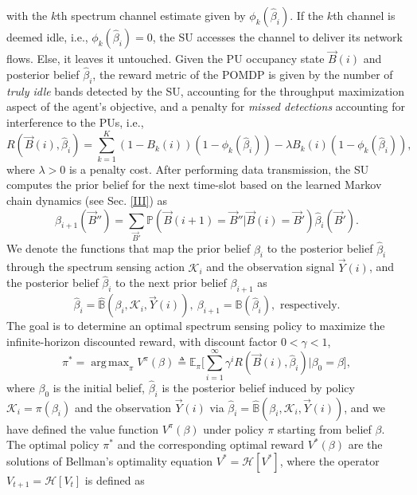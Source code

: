 \documentclass[10pt,twocolumn]{IEEEtran}
\DeclareMathOperator*{\argmax}{arg\,max}
\begin{document}
with the $k$th spectrum channel estimate given by $\phi_k(\hat{\beta}_{i})$. If  the $k$th channel is deemed idle, i.e., $\phi_{k}(\hat{\beta}_{i}){=}0$, the SU accesses the channel to deliver its network flows. Else, it leaves it untouched. Given the PU occupancy state $\vec{B}(i)$ and posterior belief $\hat\beta_i$, the reward metric of the POMDP is given by the number of \emph{truly idle} bands detected by the SU, accounting for the throughput maximization aspect of the agent's objective, and a penalty for \emph{missed detections} accounting for interference to the PUs, i.e.,
\begin{equation}
\nonumber
    R(\vec{B}(i), \hat{\beta}_i){=}\sum_{k=1}^{K} (1{-}B_k(i))(1{-}\phi_k(\hat{\beta}_{i})){-}\lambda B_k(i)(1 - \phi_k(\hat{\beta}_i)),
\end{equation}
where $\lambda{>}0$ is a penalty cost. After performing data transmission, the SU computes the prior belief for the next time-slot based on the learned Markov chain dynamics
(see Sec. \ref{III}) as
\begin{equation}\label{13}
    \beta_{i+1}(\vec{B}'')=\sum_{\vec{B}'}\mathbb{P}(\vec{B}(i+1) = \vec{B}''|\vec{B}(i)=\vec{B}')\hat{\beta}_{i}(\vec{B}').
\end{equation}
We denote the functions that map the prior belief $\beta_i$ to the posterior belief $\hat\beta_i$ through the spectrum sensing action $\mathcal K_i$ and the observation signal $\vec{Y}(i)$, and the posterior belief $\hat\beta_i$ to the next prior belief $\beta_{i+1}$ as
$$\hat\beta_i{=}\hat{\mathbb B}(\beta_i, \mathcal K_i, \vec{Y}(i)),\ \beta_{i+1}{=}{\mathbb B}(\hat\beta_i),\text{ respectively}.$$
The goal is to determine an optimal spectrum sensing policy to maximize the infinite-horizon discounted reward, with discount factor $0{<}\gamma{<}1$,
\begin{equation}\label{14}
    \pi^{*}{=}\argmax_{\pi} V^{\pi}(\beta) \triangleq \mathbb{E}_{\pi} \Big[\sum_{i=1}^{\infty} \gamma^{i} R(\vec{B}(i), \hat{\beta}_i)|\beta_0 {=}\beta\Big],
\end{equation}
where $\beta_0$ is the initial belief, $\hat\beta_i$ is the posterior belief induced by policy $\mathcal K_i{=}\pi(\beta_i)$ and the observation $\vec{Y}(i)$ via $\hat\beta_i{=}\hat{\mathbb B}(\beta_i, \mathcal K_i, \vec{Y}(i))$, and we have defined the value function $V^{\pi}(\beta)$ under policy $\pi$ starting from belief $\beta$.
The optimal policy $\pi^*$ and the corresponding optimal reward $V^*(\beta)$ are the solutions of Bellman's optimality equation $V^*{=}\mathcal{H}[V^*]$, where the operator $V_{t+1}{=}\mathcal {H}[V_{t}]$ is defined as
\end{document}
